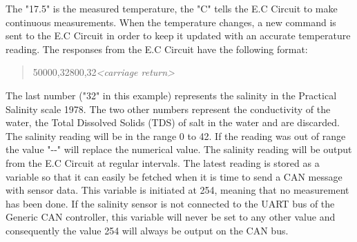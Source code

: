 The "17.5" is the measured temperature, the "C" tells the E.C Circuit to make continuous measurements. When the temperature changes, a new command is sent to the E.C Circuit in order to keep it updated with an accurate temperature reading. \newline
The responses from the E.C Circuit have the following format:

\begin{quote}
50000,32800,32\emph{<carriage return>}
\end{quote}

The last number ("32" in this example) represents the salinity in the Practical Salinity scale 1978. The two other numbers represent the conductivity of the water, the Total Dissolved Solids (TDS) of salt in the water and are discarded. The salinity reading will be in the range 0 to 42. If the reading was out of range the value "\--\--" will replace the numerical value. \newline
The salinity reading will be output from the E.C Circuit at regular intervals. The latest reading is stored as a variable so that it can easily be fetched when it is time to send a CAN message with sensor data. This variable is initiated at 254, meaning that no measurement has been done. If the salinity sensor is not connected to the UART bus of the Generic CAN controller, this variable will never be set to any other value and consequently the value 254 will always be output on the CAN bus.

